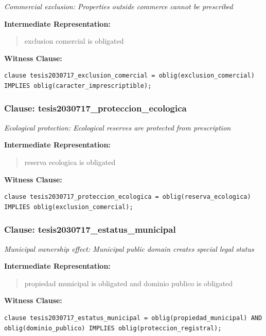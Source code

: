 \documentclass[11pt,a4paper]{article}
\begin{document}
\textit{Commercial exclusion: Properties outside commerce cannot be prescribed}

\textbf{Intermediate Representation:}

\begin{quote}
exclusion comercial is obligated
\end{quote}

\textbf{Witness Clause:}

\begin{lstlisting}[style=witnessstyle, language=Witness]
clause tesis2030717_exclusion_comercial = oblig(exclusion_comercial) IMPLIES oblig(caracter_imprescriptible);
\end{lstlisting}

\subsubsection{Clause: tesis2030717\_proteccion\_ecologica}

\textit{Ecological protection: Ecological reserves are protected from prescription}

\textbf{Intermediate Representation:}

\begin{quote}
reserva ecologica is obligated
\end{quote}

\textbf{Witness Clause:}

\begin{lstlisting}[style=witnessstyle, language=Witness]
clause tesis2030717_proteccion_ecologica = oblig(reserva_ecologica) IMPLIES oblig(exclusion_comercial);
\end{lstlisting}

\subsubsection{Clause: tesis2030717\_estatus\_municipal}

\textit{Municipal ownership effect: Municipal public domain creates special legal status}

\textbf{Intermediate Representation:}

\begin{quote}
propiedad municipal is obligated and dominio publico is obligated
\end{quote}

\textbf{Witness Clause:}

\begin{lstlisting}[style=witnessstyle, language=Witness]
clause tesis2030717_estatus_municipal = oblig(propiedad_municipal) AND oblig(dominio_publico) IMPLIES oblig(proteccion_registral);
\end{lstlisting}
\end{document}
